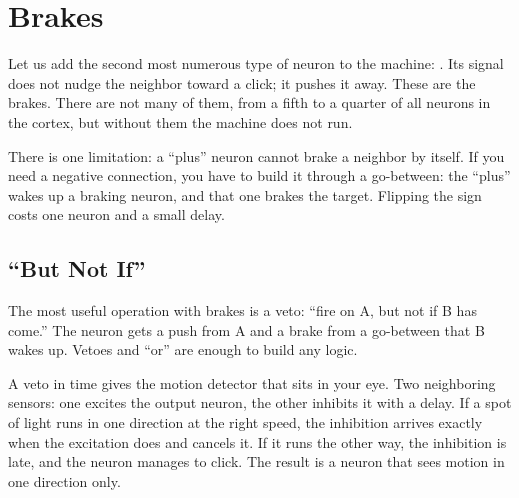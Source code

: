 \chapter{Brakes}

Let us add the second most numerous type of neuron to the machine: . Its signal does not nudge the neighbor toward a click; it pushes it away. These are the brakes. There are not many of them, from a fifth to a quarter of all neurons in the cortex, but without them the machine does not run.

There is one limitation: a ``plus'' neuron cannot brake a neighbor by itself. If you need a negative connection, you have to build it through a go-between: the ``plus'' wakes up a braking neuron, and that one brakes the target. Flipping the sign costs one neuron and a small delay.

\section*{``But Not If''}

The most useful operation with brakes is a veto: ``fire on A, but not if B has come.'' The neuron gets a push from A and a brake from a go-between that B wakes up. Vetoes and ``or'' are enough to build any logic.


A veto in time gives the motion detector that sits in your eye. Two neighboring sensors: one excites the output neuron, the other inhibits it with a delay. If a spot of light runs in one direction at the right speed, the inhibition arrives exactly when the excitation does and cancels it. If it runs the other way, the inhibition is late, and the neuron manages to click. The result is a neuron that sees motion in one direction only.


